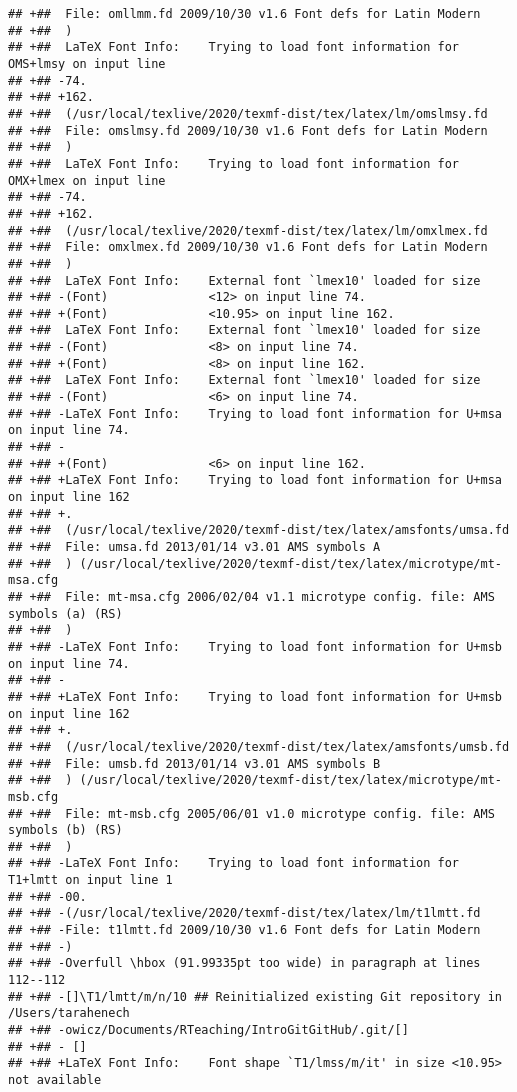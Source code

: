 \documentclass[ignorenonframetext,]{beamer}
\begin{document}
\begin{verbatim}
## +##  File: omllmm.fd 2009/10/30 v1.6 Font defs for Latin Modern
## +##  )
## +##  LaTeX Font Info:    Trying to load font information for OMS+lmsy on input line 
## +## -74.
## +## +162.
## +##  (/usr/local/texlive/2020/texmf-dist/tex/latex/lm/omslmsy.fd
## +##  File: omslmsy.fd 2009/10/30 v1.6 Font defs for Latin Modern
## +##  )
## +##  LaTeX Font Info:    Trying to load font information for OMX+lmex on input line 
## +## -74.
## +## +162.
## +##  (/usr/local/texlive/2020/texmf-dist/tex/latex/lm/omxlmex.fd
## +##  File: omxlmex.fd 2009/10/30 v1.6 Font defs for Latin Modern
## +##  )
## +##  LaTeX Font Info:    External font `lmex10' loaded for size
## +## -(Font)              <12> on input line 74.
## +## +(Font)              <10.95> on input line 162.
## +##  LaTeX Font Info:    External font `lmex10' loaded for size
## +## -(Font)              <8> on input line 74.
## +## +(Font)              <8> on input line 162.
## +##  LaTeX Font Info:    External font `lmex10' loaded for size
## +## -(Font)              <6> on input line 74.
## +## -LaTeX Font Info:    Trying to load font information for U+msa on input line 74.
## +## -
## +## +(Font)              <6> on input line 162.
## +## +LaTeX Font Info:    Trying to load font information for U+msa on input line 162
## +## +.
## +##  (/usr/local/texlive/2020/texmf-dist/tex/latex/amsfonts/umsa.fd
## +##  File: umsa.fd 2013/01/14 v3.01 AMS symbols A
## +##  ) (/usr/local/texlive/2020/texmf-dist/tex/latex/microtype/mt-msa.cfg
## +##  File: mt-msa.cfg 2006/02/04 v1.1 microtype config. file: AMS symbols (a) (RS)
## +##  )
## +## -LaTeX Font Info:    Trying to load font information for U+msb on input line 74.
## +## -
## +## +LaTeX Font Info:    Trying to load font information for U+msb on input line 162
## +## +.
## +##  (/usr/local/texlive/2020/texmf-dist/tex/latex/amsfonts/umsb.fd
## +##  File: umsb.fd 2013/01/14 v3.01 AMS symbols B
## +##  ) (/usr/local/texlive/2020/texmf-dist/tex/latex/microtype/mt-msb.cfg
## +##  File: mt-msb.cfg 2005/06/01 v1.0 microtype config. file: AMS symbols (b) (RS)
## +##  )
## +## -LaTeX Font Info:    Trying to load font information for T1+lmtt on input line 1
## +## -00.
## +## -(/usr/local/texlive/2020/texmf-dist/tex/latex/lm/t1lmtt.fd
## +## -File: t1lmtt.fd 2009/10/30 v1.6 Font defs for Latin Modern
## +## -)
## +## -Overfull \hbox (91.99335pt too wide) in paragraph at lines 112--112
## +## -[]\T1/lmtt/m/n/10 ## Reinitialized existing Git repository in /Users/tarahenech
## +## -owicz/Documents/RTeaching/IntroGitGitHub/.git/[] 
## +## - []
## +## +LaTeX Font Info:    Font shape `T1/lmss/m/it' in size <10.95> not available

\end{verbatim}
\end{document}
